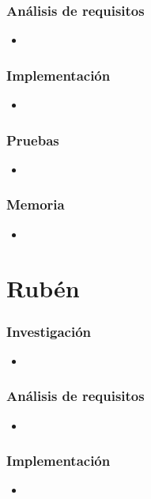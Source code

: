 \subsubsection{Análisis de requisitos}
\begin{itemize}
	\item 
\end{itemize}
\subsubsection{Implementación}
\begin{itemize}
	\item 
\end{itemize}
\subsubsection{Pruebas}
\begin{itemize}
	\item 
\end{itemize}
\subsubsection{Memoria}
\begin{itemize}
	\item 
\end{itemize}

\section{Rubén}
\subsubsection{Investigación}
\begin{itemize}
	\item 
\end{itemize}
\subsubsection{Análisis de requisitos}
\begin{itemize}
	\item 
\end{itemize}
\subsubsection{Implementación}
\begin{itemize}
	\item 
\end{itemize}
